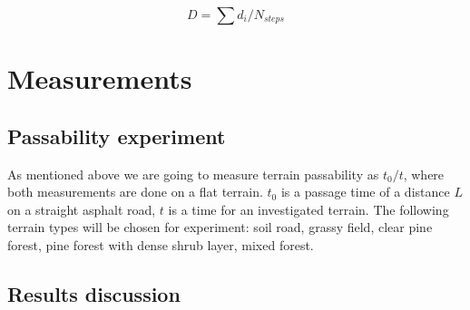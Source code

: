 \documentclass[12pt]{article}
\begin{document}
\begin{equation}
D = \sum d_{i} / N_{steps}
\end{equation}


\newpage
\section{Measurements}

\subsection{Passability experiment}
As mentioned above we are going to measure terrain passability as $t_{0}/t$, where both measurements are done on a flat terrain. $t_{0}$ is a passage time of a distance $L$ on a straight asphalt road, $t$ is a time for an investigated terrain. The following terrain types will be chosen for experiment: soil road, grassy field, clear pine forest, pine forest with dense shrub layer, mixed forest. 


\subsection{Results discussion}



\newpage
\appendix


\end{document}
